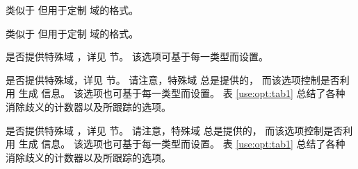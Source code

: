 \begin{optionlist}


类似于  但用于定制  域的格式。


类似于  但用于定制  域的格式。



是否提供特殊域 ，详见   节。
该选项可基于每一类型而设置。



是否提供特殊域，详见  节。
请注意，特殊域  总是提供的，
而该选项控制是否利用  生成   信息。
该选项也可基于每一类型而设置。
表 \ref{use:opt:tab1} 总结了各种  消除歧义的计数器以及所跟踪的选项。



是否提供特殊域  ，详见  节。
请注意，特殊域  总是提供的，
而该选项控制是否利用  生成   信息。
该选项也可基于每一类型而设置。
表 \ref{use:opt:tab1} 总结了各种  消除歧义的计数器以及所跟踪的选项。


\end{optionlist}
